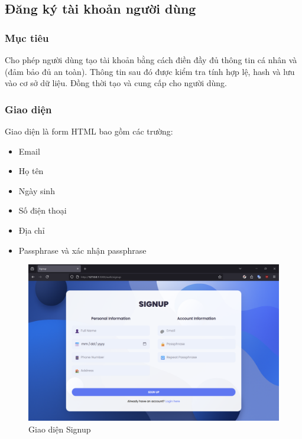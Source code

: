 \subsection{Đăng ký tài khoản người dùng}
\subsubsection*{Mục tiêu}
Cho phép người dùng tạo tài khoản bằng cách điền đầy đủ thông tin cá nhân và  (đảm bảo đủ an toàn). Thông tin sau đó được kiểm tra tính hợp lệ, hash  và lưu vào cơ sở dữ liệu. Đồng thời tạo  và cung cấp cho người dùng.

\subsubsection*{Giao diện}
Giao diện  là form HTML bao gồm các trường:
\begin{itemize}
    \item Email
    \item Họ tên
    \item Ngày sinh
    \item Số điện thoại
    \item Địa chỉ
    \item Passphrase và xác nhận passphrase
\end{itemize}
\begin{figure}[H]
\centering
\includegraphics[scale=0.34]{img/sign-up.png}
\caption{Giao diện Signup}
\label{fig:signup_ui}
\end{figure}

